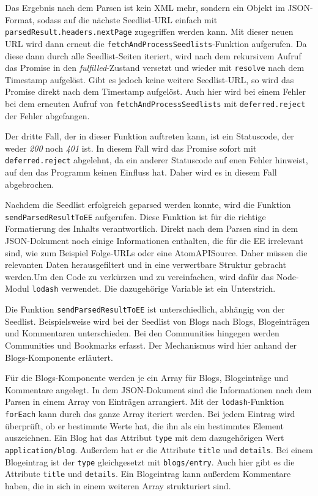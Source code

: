 Das Ergebnis nach dem Parsen ist kein \ac{XML} mehr, sondern ein Objekt im \acs{JSON}-Format, sodass auf die nächste Seedlist-\ac{URL} einfach mit \texttt{parsedResult.headers.nextPage} zugegriffen werden kann. Mit dieser neuen \ac{URL} wird dann erneut die \texttt{fetchAndProcessSeedlists}-Funktion aufgerufen. Da diese dann durch alle Seedlist-Seiten iteriert, wird nach dem rekursivem Aufruf das Promise in den \textit{fulfilled}-Zustand versetzt und wieder mit \texttt{resolve} nach dem Timestamp aufgelöst. Gibt es jedoch keine weitere Seedlist-\ac{URL}, so wird das Promise direkt nach dem Timestamp aufgelöst. Auch hier wird bei einem Fehler bei dem erneuten Aufruf von \texttt{fetchAndProcessSeedlists} mit \texttt{deferred.reject} der Fehler abgefangen.

Der dritte Fall, der in dieser Funktion auftreten kann, ist ein Statuscode, der weder \textit{200} noch \textit{401} ist. In diesem Fall wird das Promise sofort mit \texttt{deferred.reject} abgelehnt, da ein anderer Statuscode auf enen Fehler hinweist, auf den das Programm keinen Einfluss hat. Daher wird es in diesem Fall abgebrochen.

Nachdem die Seedlist erfolgreich geparsed werden konnte, wird die Funktion \texttt{sendParsedResultToEE} aufgerufen. Diese Funktion ist für die richtige Formatierung des Inhalts verantwortlich. Direkt nach dem Parsen sind in dem \ac{JSON}-Dokument noch einige Informationen enthalten, die für die \acl{EE} irrelevant sind, wie zum Beispiel Folge-\acp{URL} oder eine AtomAPISource. Daher müssen die relevanten Daten herausgefiltert und in eine verwertbare Struktur gebracht werden.Um den Code zu verkürzen und zu vereinfachen, wird dafür das Node-Modul \texttt{lodash} verwendet. Die dazugehörige Variable ist ein Unterstrich.

Die Funktion \texttt{sendParsedResultToEE} ist unterschiedlich, abhängig von der Seedlist. Beispielsweise wird bei der Seedlist von Blogs nach Blogs, Blogeinträgen und Kommentaren unterschieden. Bei den Communities hingegen werden Communities und Bookmarks erfasst. Der Mechanismus wird hier anhand der Blogs-Komponente erläutert.

Für die Blogs-Komponente werden je ein Array für Blogs, Blogeinträge und Kommentare angelegt. In dem \acs{JSON}-Dokument sind die Informationen nach dem Parsen in einem Array von Einträgen arrangiert. Mit der \texttt{lodash}-Funktion \texttt{forEach} kann durch das ganze Array iteriert werden. Bei jedem Eintrag wird überprüft, ob er bestimmte Werte hat, die ihn als ein bestimmtes Element auszeichnen. Ein Blog hat das Attribut \texttt{type} mit dem dazugehörigen Wert \texttt{application/blog}. Außerdem hat er die Attribute \texttt{title} und \texttt{details}. Bei einem Blogeintrag ist der \texttt{type} gleichgesetzt mit \texttt{blogs/entry}. Auch hier gibt es die Attribute \texttt{title} und \texttt{details}. Ein Blogeintrag kann außerdem Kommentare haben, die in sich in einem weiteren Array strukturiert sind. 

